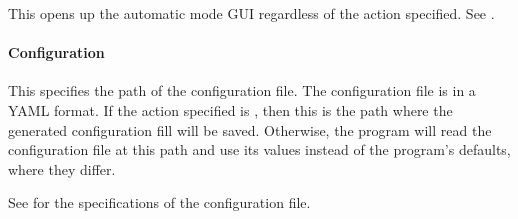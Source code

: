 \documentclass[letterpaper,11pt,english]{sphinxmanual}
\begin{document}
\begin{savenotes}\begin{fulllineitems}
\label{\detokenize{user/command_line:cmdoption-automatic}}
\pysigstartsignatures
{}
\pysigstopsignatures
\end{fulllineitems}\end{savenotes}


\sphinxAtStartPar
This opens up the automatic mode GUI regardless of the action specified. See {\hyperref[\detokenize{user/command_line:user-command-line-available-actions-automatic}]{}}.


\paragraph{Configuration}
\label{\detokenize{user/command_line:configuration}}\label{\detokenize{user/command_line:user-command-line-available-options-configuration}}

\begin{savenotes}\begin{fulllineitems}
\label{\detokenize{user/command_line:cmdoption-config}}
\pysigstartsignatures
{}
\pysigstopsignatures
\end{fulllineitems}\end{savenotes}


\sphinxAtStartPar
This specifies the path of the configuration file. The configuration file is
in a YAML format. If the action specified is {\hyperref[\detokenize{user/command_line:cmdoption-arg-generate}]{}}, then this is
the path where the generated configuration fill will be saved. Otherwise, the
program will read the configuration file at this path and use its values
instead of the program’s defaults, where they differ.

\sphinxAtStartPar
See {\hyperref[\detokenize{user/configuration:user-configuration-standard-configuration-file}]{}} for the
specifications of the configuration file.
\end{document}
